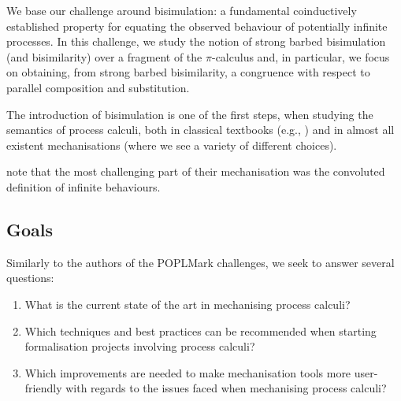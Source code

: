 \documentclass[runningheads]{llncs}
\begin{document}
We base our challenge around
bisimulation: a fundamental coinductively established property for equating the
observed behaviour of potentially infinite processes. 
In this challenge, we study the notion of strong barbed bisimulation
(and bisimilarity)
over a fragment of the $\pi$-calculus and,
in particular, we focus on obtaining,
from strong barbed bisimilarity,
a congruence with respect to
parallel composition and substitution.

The introduction of bisimulation
is one of the first steps, when studying the
semantics of process calculi, both
in classical textbooks (e.g., \cite{})
and in almost all existent 
mechanisations \cite{}
(where we see a variety
of different choices).


\cite{Castro-Perez2021} note that the most challenging part of their mechanisation was the convoluted definition of infinite behaviours.





\subsection{Goals}%
Similarly to the authors of the POPLMark challenges, we seek to
answer several questions:
\begin{enumerate}[label=\textbf{(Q\arabic*)},leftmargin=10mm]
\item\label{item:rq1} What is the current state of the art in mechanising process calculi?
\item\label{item:rq2} Which techniques and best practices can be recommended when starting formalisation projects involving process calculi?
\item\label{item:rq3} Which improvements are needed to make mechanisation tools more user-friendly with regards to the issues faced when mechanising process calculi?
\end{enumerate}
\end{document}
